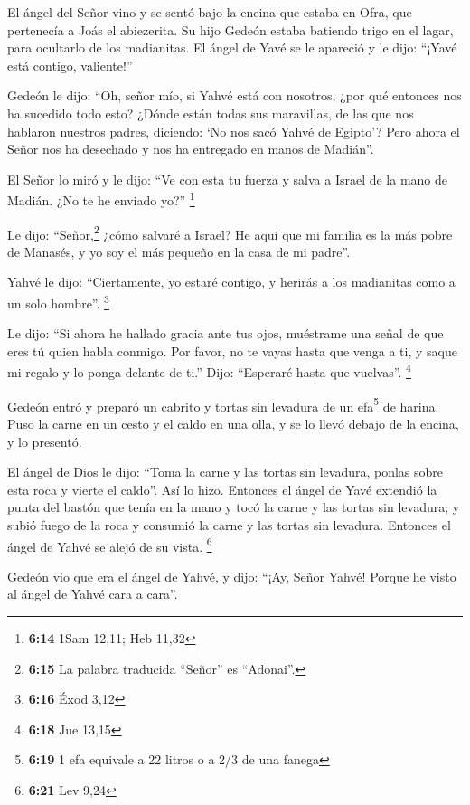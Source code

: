\begin{paracol}{2}
 El ángel del Señor vino y se sentó bajo la encina que
estaba en Ofra, que pertenecía a Joás el abiezerita. Su hijo Gedeón
estaba batiendo trigo en el lagar, para ocultarlo de los madianitas.
 El ángel de Yavé se le apareció y le dijo: ``¡Yavé está
contigo, valiente!''

 Gedeón le dijo: ``Oh, señor mío, si Yahvé está con
nosotros, ¿por qué entonces nos ha sucedido todo esto? ¿Dónde están
todas sus maravillas, de las que nos hablaron nuestros padres, diciendo:
`No nos sacó Yahvé de Egipto'? Pero ahora el Señor nos ha desechado y
nos ha entregado en manos de Madián''.

 El Señor lo miró y le dijo: ``Ve con esta tu fuerza y
salva a Israel de la mano de Madián. ¿No te he enviado yo?'' \footnote{\textbf{6:14}
  1Sam 12,11; Heb 11,32}

 Le dijo: ``Señor,\footnote{\textbf{6:15} La palabra
  traducida ``Señor'' es ``Adonai''.} ¿cómo salvaré a Israel? He aquí
que mi familia es la más pobre de Manasés, y yo soy el más pequeño en la
casa de mi padre''.

 Yahvé le dijo: ``Ciertamente, yo estaré contigo, y
herirás a los madianitas como a un solo hombre''. \footnote{\textbf{6:16}
  Éxod 3,12}

 Le dijo: ``Si ahora he hallado gracia ante tus ojos,
muéstrame una señal de que eres tú quien habla conmigo. 
Por favor, no te vayas hasta que venga a ti, y saque mi regalo y lo
ponga delante de ti.'' Dijo: ``Esperaré hasta que vuelvas''. \footnote{\textbf{6:18}
  Jue 13,15}

 Gedeón entró y preparó un cabrito y tortas sin levadura
de un efa\footnote{\textbf{6:19} 1 efa equivale a 22 litros o a 2/3 de
  una fanega} de harina. Puso la carne en un cesto y el caldo en una
olla, y se lo llevó debajo de la encina, y lo presentó.

 El ángel de Dios le dijo: ``Toma la carne y las tortas
sin levadura, ponlas sobre esta roca y vierte el caldo''. Así lo hizo.
 Entonces el ángel de Yavé extendió la punta del bastón
que tenía en la mano y tocó la carne y las tortas sin levadura; y subió
fuego de la roca y consumió la carne y las tortas sin levadura. Entonces
el ángel de Yahvé se alejó de su vista. \footnote{\textbf{6:21} Lev 9,24}

 Gedeón vio que era el ángel de Yahvé, y dijo: ``¡Ay,
Señor Yahvé! Porque he visto al ángel de Yahvé cara a cara''.


\end{paracol}
